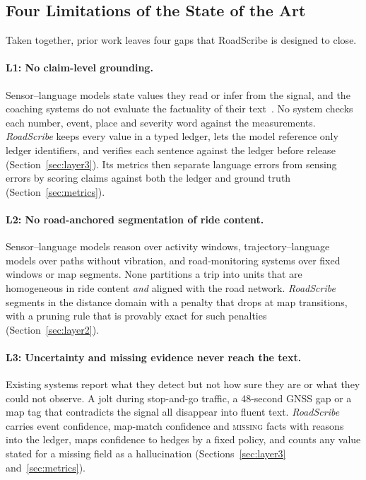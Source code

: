 \subsection{Four Limitations of the State of the Art}
\label{sec:limitations}

Taken together, prior work leaves four gaps that RoadScribe is designed to close.

\paragraph{L1: No claim-level grounding.}
Sensor--language models state values they read or infer from the signal, and the coaching systems do not evaluate the factuality of their text~\cite{thompson2026localising}.
No system checks each number, event, place and severity word against the measurements.
\emph{RoadScribe} keeps every value in a typed ledger, lets the model reference only ledger identifiers, and verifies each sentence against the ledger before release (Section~\ref{sec:layer3}).
Its metrics then separate language errors from sensing errors by scoring claims against both the ledger and ground truth (Section~\ref{sec:metrics}).

\paragraph{L2: No road-anchored segmentation of ride content.}
Sensor--language models reason over activity windows, trajectory--language models over paths without vibration, and road-monitoring systems over fixed windows or map segments.
None partitions a trip into units that are homogeneous in ride content \emph{and} aligned with the road network.
\emph{RoadScribe} segments in the distance domain with a penalty that drops at map transitions, with a pruning rule that is provably exact for such penalties (Section~\ref{sec:layer2}).

\paragraph{L3: Uncertainty and missing evidence never reach the text.}
Existing systems report what they detect but not how sure they are or what they could not observe.
A jolt during stop-and-go traffic, a 48-second GNSS gap or a map tag that contradicts the signal all disappear into fluent text.
\emph{RoadScribe} carries event confidence, map-match confidence and \textsc{missing} facts with reasons into the ledger, maps confidence to hedges by a fixed policy, and counts any value stated for a missing field as a hallucination (Sections~\ref{sec:layer3} and~\ref{sec:metrics}).

